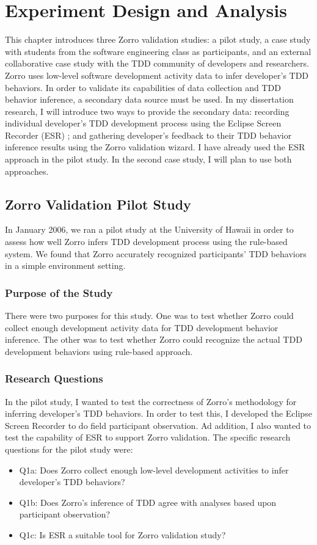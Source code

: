 \chapter{Experiment Design and Analysis}
\label{ch:ExperimentDesign}
This chapter introduces three Zorro validation studies: a pilot study,
a case study with students from the software engineering class as
participants, and an external collaborative case study with the TDD
community of developers and researchers. Zorro uses low-level software
development activity data to infer developer's TDD behaviors.  In
order to validate its capabilities of data collection and TDD behavior
inference, a secondary data source must be used. In my dissertation
research, I will introduce two ways to provide the secondary data:
recording individual developer's TDD development process using the
Eclipse Screen Recorder (ESR) \cite{esr}; and gathering developer's
feedback to their TDD behavior inference results using the Zorro
validation wizard.  I have already used the ESR approach in the pilot
study. In the second case study, I will plan to use both approaches.

\section{Zorro Validation Pilot Study}
In January 2006, we ran a pilot study at the University of Hawaii in
order to assess how well Zorro infers TDD development process using
the rule-based system. We found that Zorro accurately recognized
participants' TDD behaviors in a simple environment setting.

\subsection{Purpose of the Study}
There were two purposes for this study. One was to test whether Zorro 
could collect enough development activity data for TDD development 
behavior inference. The other was to test whether Zorro could 
recognize the actual TDD development behaviors using rule-based 
approach.

\subsection{Research Questions}
In the pilot study, I wanted to test the correctness of Zorro's
methodology for inferring developer's TDD behaviors. In order to
test this, I developed the Eclipse Screen Recorder \cite{esr} to
do field participant observation. Ad addition, I also wanted to 
test the capability of ESR to support Zorro validation. The specific 
research questions for the pilot study were:
\begin{itemize}
 \item Q1a: Does Zorro collect enough low-level development activities to
   infer developer's TDD behaviors?
 \item Q1b: Does Zorro's inference of TDD agree with analyses based upon
   participant observation?
 \item Q1c: Is ESR a suitable tool for Zorro validation study?
\end{itemize}

